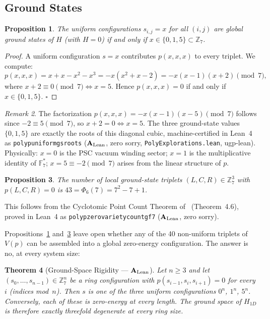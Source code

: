 \documentclass[11pt]{article}
\newtheorem{theorem}{Theorem}[section]
\newtheorem{proposition}[theorem]{Proposition}
\theoremstyle{remark}
\newtheorem{remark}[theorem]{Remark}
\newcommand{\lean}[1]{%
  \penalty-100
  \begingroup\def\_{\textunderscore\allowbreak}\texttt{#1}\endgroup}
\newcommand{\CatAL}{\ensuremath{\textbf{A}_{\rm Lean}}}
\begin{document}
\subsection{Ground States}

\begin{proposition}\label{prop:gs}
The uniform configurations $s_{i,j} = x$ for all $(i,j)$ are global ground states
of $H$ (with $H = 0$) if and only if $x \in \{0, 1, 5\} \subset \mathbb{Z}_7$.
\end{proposition}

\begin{proof}
A uniform configuration $s = x$ contributes $p(x,x,x)$ to every triplet. We compute:
\[
  p(x,x,x) = x + x - x^2 - x^3 = -x(x^2 + x - 2) = -x(x-1)(x+2) \pmod 7,
\]
where $x + 2 \equiv 0 \pmod 7 \Leftrightarrow x = 5$. Hence $p(x,x,x) = 0$ if
and only if $x \in \{0, 1, 5\}$. $\square$
\end{proof}

\begin{remark}
The factorization $p(x,x,x) = -x(x-1)(x-5) \pmod 7$ follows since $-2 \equiv 5
\pmod 7$, so $x+2 = 0 \Leftrightarrow x = 5$. The three ground-state values
$\{0, 1, 5\}$ are exactly the roots of this diagonal cubic, machine-certified in
Lean~4 as \lean{poly\_p\_uniform\_gs\_roots} (\CatAL{}, zero sorry,
\texttt{PolyExplorations.lean}, ugp-lean). Physically: $x = 0$ is the PSC vacuum
winding sector; $x = 1$ is the multiplicative identity of $\mathbb{F}_7^*$;
$x = 5 \equiv -2 \pmod 7$ arises from the linear structure of $p$.
\end{remark}

\begin{proposition}\label{prop:local-gs}
The number of local ground-state triplets $(L,C,R) \in \mathbb{Z}_7^3$ with
$p(L,C,R) = 0$ is $43 = \Phi_6(7) = 7^2 - 7 + 1$.
\end{proposition}

This follows from the Cyclotomic Point Count Theorem of~\cite{SpivackGTEPolynomialWolfram}
(Theorem~4.6), proved in Lean~4 as \lean{poly\_p\_zero\_variety\_count\_gf7} (\CatAL{},
zero sorry).

Propositions~\ref{prop:gs} and~\ref{prop:local-gs} leave open whether any of the
40 non-uniform triplets of $V(p)$ can be assembled into a global zero-energy
configuration. The answer is no, at every system size:

\begin{theorem}[Ground-Space Rigidity --- \CatAL{}]\label{thm:rigidity}
Let $n \ge 3$ and let $(s_0, \ldots, s_{n-1}) \in \mathbb{Z}_7^n$ be a ring
configuration with $p(s_{i-1}, s_i, s_{i+1}) = 0$ for every $i$ (indices
mod~$n$). Then $s$ is one of the three uniform configurations $0^n$, $1^n$,
$5^n$. Conversely, each of these is zero-energy at every length. The ground
space of $H_{1D}$ is therefore exactly threefold degenerate at every ring size.
\end{theorem}
\end{document}
